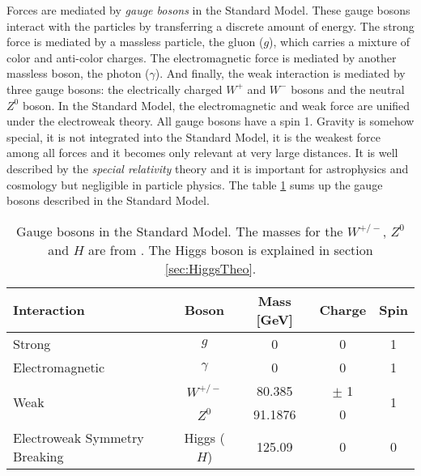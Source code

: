 Forces are mediated by \textit{gauge bosons} in the Standard Model. These gauge bosons interact with the particles by transferring a discrete amount of energy. The strong force is mediated by a massless particle, the gluon ($g$), which carries a mixture of color and anti-color charges. The electromagnetic force is mediated by another massless boson, the photon ($\gamma$). And finally, the weak interaction is mediated by three gauge bosons: the electrically charged $W^+$ and $W^-$ bosons and the neutral $Z^0$ boson. In the Standard Model, the electromagnetic and weak force are unified under the electroweak theory. All gauge bosons have a spin 1. Gravity is somehow special, it is not integrated into the Standard Model, it is the weakest force among all forces and it becomes only relevant at very large distances. It is well described by the \textit{special relativity} theory \cite{Einstein:1905ve} and it is important for astrophysics and cosmology but negligible in particle physics. The table \ref{table:GaugeBosons} sums up the gauge bosons described in the Standard Model.

\begin{table}[htb!]
  \centering
  \caption{Gauge bosons in the Standard Model. The masses for the $W^{+/-}$, $Z^0$ and $H$ are from \cite{Patrignani:2016xqp}. The Higgs boson is explained in section \ref{sec:HiggsTheo}.}
  \label{table:GaugeBosons}
  \begin{tabular}{|p{7cm}||cccc|}
    \hline
    Interaction & Boson & Mass [GeV] & Charge & Spin\\
    \hline
    Strong & $g$ & 0 & 0 & 1\\
    \hline
    Electromagnetic & $\gamma$ & 0 & 0 & 1\\
    \hline
    \multirow{2}{*}{Weak} & $W^{+/-}$ & 80.385 & $\pm$ 1 & \multirow{2}{*}{1}\\
    & $Z^0$ & 91.1876 & 0 &\\
    \hline
    \hline
    Electroweak Symmetry Breaking & Higgs ($H$) & 125.09 & 0 & 0\\
    \hline
  \end{tabular}
\end{table}

